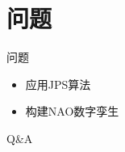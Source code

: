 \documentclass[notheorems, aspectratio=54]{beamer}
\begin{document}
\section{问题}
\begin{frame}{问题}
     \begin{itemize}
        \item 应用JPS算法
        \item 构建NAO数字孪生
    \end{itemize}
\end{frame}

\begin{frame}
    \centering
    Q\&A
\end{frame}
\end{document}

